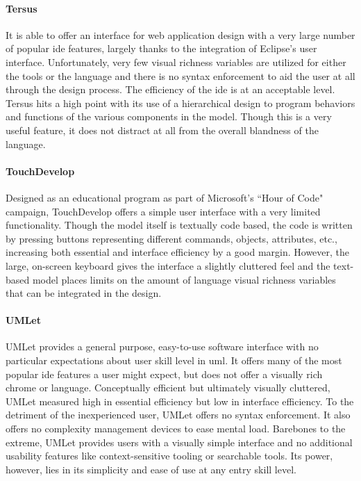 \paragraph{Tersus} It is able to offer an interface for web application
design with a very large number of popular \ac{ide} features, largely
thanks to the integration of Eclipse's user interface. Unfortunately, very
few visual richness variables are utilized for either the tools or the
language and there is no syntax enforcement to aid the user at all through
the design process. The efficiency of the \ac{ide} is at an acceptable level.
Tersus hits a high point with its use of a hierarchical design to program
behaviors and functions of the various components in the model. Though this
is a very useful feature, it does not distract at all from the overall
blandness of the language.

\paragraph{TouchDevelop} Designed as an educational program as part of
Microsoft's ``Hour of Code" campaign, TouchDevelop offers a simple user
interface with a very limited functionality. Though the model itself is
textually code based, the code is written by pressing buttons representing
different commands, objects, attributes, etc., increasing both essential
and interface efficiency by a good margin. However, the large, on-screen keyboard
gives the interface a slightly cluttered feel and the text-based
model places limits on the amount of language visual richness variables
that can be integrated in the design.

\paragraph{UMLet} UMLet provides a general purpose, easy-to-use software
interface with no particular expectations about user skill level in \ac{uml}. It offers
many of the most popular \ac{ide} features a user might expect, but does
not offer a visually rich chrome or language. Conceptually efficient but
ultimately visually cluttered, UMLet measured high in essential efficiency but
low in interface efficiency. To the detriment of the inexperienced user,
UMLet offers no syntax enforcement. It also offers no complexity management
devices to ease mental load. Barebones to the extreme, UMLet provides users
with a visually simple interface and no additional usability features like
context-sensitive tooling or searchable tools. Its power, however, lies in
its simplicity and ease of use at any entry skill level.

